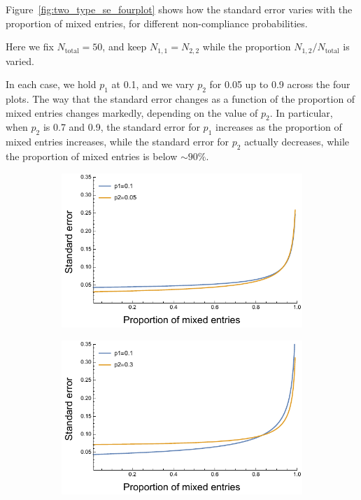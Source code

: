 \documentclass{article}
\newif\ifproofread
\newcommand{\rev}[1]{%
\ifproofread
\hl{#1}%
\else
#1%
\fi
}
\begin{document}
Figure~\ref{fig:two_type_se_fourplot} shows how the standard error varies with the proportion of mixed entries, for different non-compliance probabilities. \rev{Here we fix $N_\text{total}=50$, and keep $N_{1,1}=N_{2,2}$ while the proportion $N_{1,2}/N_\text{total}$ is varied.} In each case, we hold \(p_1\) at 0.1, and we vary \(p_2\) for 0.05 up to 0.9 across the four plots. The way that the standard error changes as a function of the proportion of mixed entries changes markedly, depending on the value of \(p_2\). In particular, when \(p_2\) is 0.7 and 0.9, the standard error for \(p_1\) increases as the proportion of mixed entries increases, while the standard error for \(p_2\) actually decreases, while the proportion of mixed entries is below \(\sim 90 \%\).



\begin{figure}[H]
\begin{subfigure}[b]{.49\textwidth}
\includegraphics[width=\textwidth]{../asymptotic_approximation/SE_twotype_p1_01_p2_005.pdf}
\end{subfigure}
\hfill
\begin{subfigure}[b]{0.49\textwidth}
\includegraphics[width=\textwidth]{../asymptotic_approximation/SE_twotype_p1_01_p2_03.pdf}

\end{subfigure}
\end{figure}
\end{document}
